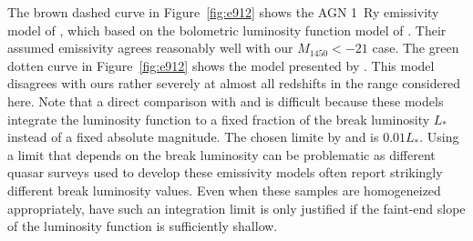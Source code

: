 \documentclass[a4paper,fleqn,usenatbib]{mnras}
\begin{document}
The brown dashed curve in Figure~\ref{fig:e912} shows the AGN 1~Ry
emissivity model of \citet{2012ApJ...746..125H}, which based on the
bolometric luminosity function model of \citet{2007ApJ...654..731H}.
Their assumed emissivity agrees reasonably well with our
$M_{1450}<-21$ case.  The green dotten curve in Figure~\ref{fig:e912}
shows the model presented by \citet{2015ApJ...813L...8M}.  This model
disagrees with ours rather severely at almost all redshifts in the
range considered here.  Note that a direct comparison with
\citet{2012ApJ...746..125H} and \citet{2015ApJ...813L...8M} is
difficult because these models integrate the luminosity function to a
fixed fraction of the break luminosity $L_*$ instead of a fixed
absolute magnitude.  The chosen limite by \citet{2012ApJ...746..125H}
and \citet{2015ApJ...813L...8M} is $0.01L_*$.  Using a limit that
depends on the break luminosity can be problematic as different quasar
surveys used to develop these emissivity models often report
strikingly different break luminosity values.  Even when these samples
are homogeneized appropriately, have such an integration limit is only
justified if the faint-end slope of the luminosity function is
sufficiently shallow.
\end{document}
